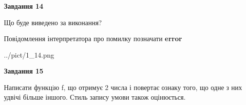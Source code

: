 \documentclass[11pt, ukrainian]{article}
\begin{document}
{\begin {large}
{\begin {center}\textbf{Завдання 14}\end {center}}\par
Що буде виведено за виконання? \par
Повідомлення інтерпретатора про помилку позначати \textbf{error}

\begin{center}
	{../pict/1_14.png}
\end{center}
\newpage

{\begin {center}\textbf{Завдання 15}\end {center}}\par

Написати функцiю f, що отримує 2 числа і повертає ознаку того, що одне з них удвічі більше іншого. Стиль запису умови також оцінюється.\par
\newpage

\end {large}}
\end{document}
